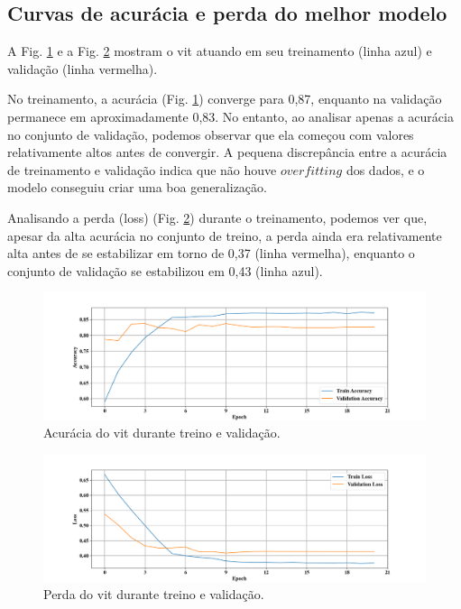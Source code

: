 \subsection{Curvas de acurácia e perda do melhor modelo}
A Fig. \ref{fig:acc} e a Fig. \ref{fig:loss} mostram o \acrshort{vit} atuando em seu treinamento (linha azul) e validação (linha vermelha).

No treinamento, a acurácia (Fig. \ref{fig:acc}) converge para 0,87, enquanto na validação permanece em aproximadamente 0,83. No entanto, ao analisar apenas a acurácia no conjunto de validação, podemos observar que ela começou com valores relativamente altos antes de convergir. A pequena discrepância entre a acurácia de treinamento e validação indica que não houve $overfitting$ dos dados, e o modelo conseguiu criar uma boa generalização.

Analisando a perda (loss) (Fig. \ref{fig:loss}) durante o treinamento, podemos ver que, apesar da alta acurácia no conjunto de treino, a perda ainda era relativamente alta antes de se estabilizar em torno de 0,37 (linha vermelha), enquanto o conjunto de validação se estabilizou em 0,43 (linha azul).

\begin{figure}[tb]
\centerline{\includegraphics[width=1\linewidth]{images/resultados/sgd_accuracy.png}}
\caption{Acurácia do \acrshort{vit} durante treino e validação.}
\label{fig:acc}
\end{figure}

\begin{figure}[tb]
\centerline{\includegraphics[width=1\linewidth]{images/resultados/sgd_loss.png}}
\caption{Perda do \acrshort{vit} durante treino e validação.}
\label{fig:loss}
\end{figure}

